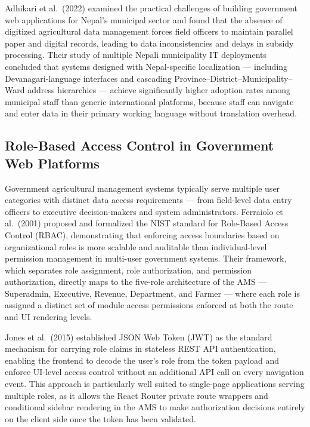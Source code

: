 \documentclass[12pt,a4paper]{report}
\begin{document}
Adhikari et al.\ (2022) examined the practical challenges of building government web
applications for Nepal's municipal sector and found that the absence of digitized
agricultural data management forces field officers to maintain parallel paper and digital
records, leading to data inconsistencies and delays in subsidy processing. Their study
of multiple Nepali municipality IT deployments concluded that systems designed with
Nepal-specific localization — including Devanagari-language interfaces and cascading
Province--District--Municipality--Ward address hierarchies — achieve significantly
higher adoption rates among municipal staff than generic international platforms, because
staff can navigate and enter data in their primary working language without translation
overhead.

\subsection{Role-Based Access Control in Government Web Platforms}

Government agricultural management systems typically serve multiple user categories
with distinct data access requirements — from field-level data entry officers to
executive decision-makers and system administrators. Ferraiolo et al.\ (2001) proposed
and formalized the NIST standard for Role-Based Access Control (RBAC), demonstrating
that enforcing access boundaries based on organizational roles is more scalable and
auditable than individual-level permission management in multi-user government systems.
Their framework, which separates role assignment, role authorization, and permission
authorization, directly maps to the five-role architecture of the AMS — Superadmin,
Executive, Revenue, Department, and Farmer — where each role is assigned a distinct
set of module access permissions enforced at both the route and UI rendering levels.

Jones et al.\ (2015) established JSON Web Token (JWT) as the standard mechanism for
carrying role claims in stateless REST API authentication, enabling the frontend to
decode the user's role from the token payload and enforce UI-level access control
without an additional API call on every navigation event. This approach is particularly
well suited to single-page applications serving multiple roles, as it allows the React
Router private route wrappers and conditional sidebar rendering in the AMS to make
authorization decisions entirely on the client side once the token has been validated.
\end{document}
